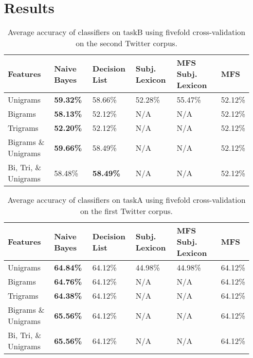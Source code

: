 \documentclass[11pt]{article}
\begin{document}
\section{Results}
\begin{table*}[htb!]
  \centering
  \begin{tabular}{| l || l | l | l | l | l |}
  \hline
  Features & Naive Bayes & Decision List & Subj. Lexicon & MFS Subj. Lexicon & MFS \\ 
  \hline \hline
  Unigrams              & \bf{59.32}\%      & 58.66\% & 52.28\% & 55.47\% 
                        & 52.12\% \\  \hline
  Bigrams               & \bf{58.13}\%      & 52.12\%      & N/A          
                        & N/A          & 52.12\% \\  \hline
  Trigrams              & \bf{52.20}\%      & 52.12\%      & N/A          
                        & N/A          & 52.12\% \\  \hline
  Bigrams \& Unigrams   & \bf{59.66}\% & 58.49\%      & N/A          
           & N/A          & 52.12\% \\  \hline
  Bi, Tri, \& Unigrams  & 58.48\%      & \bf{58.49}\%      & N/A          
           & N/A          & 52.12\% \\  \hline
  \end{tabular}
  \caption{Average accuracy of classifiers on taskB using fivefold cross-validation on the second Twitter corpus.}
\end{table*}

\begin{table*}[htbp!]
  \centering
  \begin{tabular}{| l || l | l | l | l| l |}
  \hline
  Features & Naive Bayes & Decision List & Subj. Lexicon & MFS Subj. Lexicon & MFS \\ 
  \hline \hline
  Unigrams              & \bf{64.84}\%      & 64.12\% & 44.98\% & 44.98\%
                        & 64.12\% \\  \hline
  Bigrams               & \bf{64.76}\%      & 64.12\%      & N/A      
                        & N/A          & 64.12\% \\  \hline
  Trigrams              & \bf{64.38}\%      & 64.12\%      & N/A          
                        & N/A          & 64.12\% \\  \hline
  Bigrams \& Unigrams   & \bf{65.56\%} & 64.12\%      & N/A          & N/A          & 64.12\% \\  \hline
  Bi, Tri, \& Unigrams  & \bf{65.56\%} & 64.12\%      & N/A          & N/A          & 64.12\% \\  \hline  
  \end{tabular}
  \caption{Average accuracy of classifiers on taskA using fivefold cross-validation on the first Twitter corpus.}
\end{table*}
\end{document}
